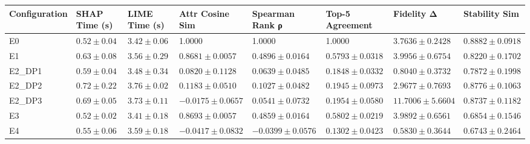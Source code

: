 \begin{tabular}{llllllll}
\toprule
Configuration & SHAP Time (s) & LIME Time (s) & Attr Cosine Sim & Spearman Rank ρ & Top-5 Agreement & Fidelity Δ & Stability Sim \\
\midrule
E0 & $0.52 \pm 0.04$ & $3.42 \pm 0.06$ & 1.0000 & 1.0000 & 1.0000 & $3.7636 \pm 0.2428$ & $0.8882 \pm 0.0918$ \\
E1 & $0.63 \pm 0.08$ & $3.56 \pm 0.29$ & $0.8681 \pm 0.0057$ & $0.4896 \pm 0.0164$ & $0.5793 \pm 0.0318$ & $3.9956 \pm 0.6754$ & $0.8220 \pm 0.1702$ \\
E2_DP1 & $0.59 \pm 0.04$ & $3.48 \pm 0.34$ & $0.0820 \pm 0.1128$ & $0.0639 \pm 0.0485$ & $0.1848 \pm 0.0332$ & $0.8040 \pm 0.3732$ & $0.7872 \pm 0.1998$ \\
E2_DP2 & $0.72 \pm 0.22$ & $3.76 \pm 0.02$ & $0.1183 \pm 0.0510$ & $0.1027 \pm 0.0482$ & $0.1945 \pm 0.0973$ & $2.9677 \pm 0.7693$ & $0.8776 \pm 0.1063$ \\
E2_DP3 & $0.69 \pm 0.05$ & $3.73 \pm 0.11$ & $-0.0175 \pm 0.0657$ & $0.0541 \pm 0.0732$ & $0.1954 \pm 0.0580$ & $11.7006 \pm 5.6604$ & $0.8737 \pm 0.1182$ \\
E3 & $0.52 \pm 0.02$ & $3.41 \pm 0.18$ & $0.8693 \pm 0.0057$ & $0.4859 \pm 0.0164$ & $0.5802 \pm 0.0219$ & $3.9892 \pm 0.6561$ & $0.6854 \pm 0.1546$ \\
E4 & $0.55 \pm 0.06$ & $3.59 \pm 0.18$ & $-0.0417 \pm 0.0832$ & $-0.0399 \pm 0.0576$ & $0.1302 \pm 0.0423$ & $0.5830 \pm 0.3644$ & $0.6743 \pm 0.2464$ \\
\bottomrule
\end{tabular}
